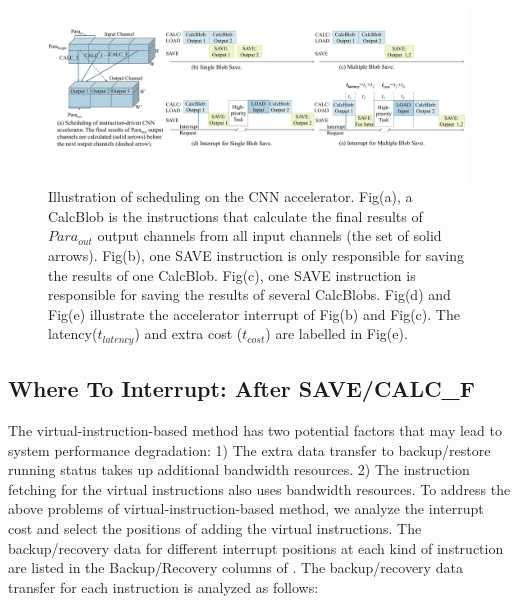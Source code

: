 






\begin{figure}[t]
    \centering
	\includegraphics[width=0.99\textwidth]{fig/singlesave.pdf} 	
	\vspace{-1mm} 
    \caption{
		Illustration of scheduling on the CNN accelerator. Fig(a), a CalcBlob is the instructions that calculate the final results of $Para_{out}$ output channels from all input channels (the set of solid arrows). Fig(b), one SAVE instruction is only responsible for saving the results of one CalcBlob. Fig(c), one SAVE instruction is responsible for saving the results of several CalcBlobs. Fig(d) and Fig(e) illustrate the accelerator interrupt of Fig(b) and Fig(c). The latency($t_{latency}$) and extra cost ($t_{cost}$) are labelled in Fig(e).
    }
	\label{fig:singlesave}
\end{figure}



\subsection{ Where To Interrupt: After SAVE/CALC\_F }
\label{sec:whereinter}
The virtual-instruction-based method has two potential factors that may lead to system performance degradation: 1) The extra data transfer to backup/restore running status takes up additional bandwidth resources. 2) The instruction fetching for the virtual instructions also uses bandwidth resources.
To address the above problems of virtual-instruction-based method, we analyze the interrupt cost and select the positions of adding the virtual instructions.
The backup/recovery data for different interrupt positions at each kind of instruction are listed in the Backup/Recovery columns of . The backup/recovery data transfer for each instruction is analyzed as follows:

